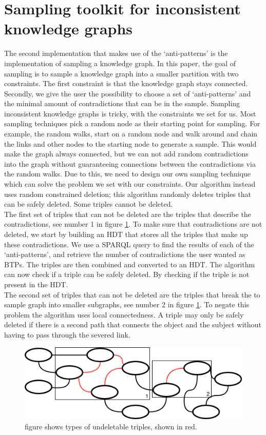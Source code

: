 \documentclass[11pt,letterpaper ,oneside ]{book}
\begin{document}
	\section{Sampling toolkit for inconsistent knowledge graphs}
	The second implementation that makes use of the `anti-patterns' is the implementation of sampling a knowledge graph. In this paper, the goal of sampling is to sample a knowledge graph into a smaller partition with two constraints. The first constraint is that the knowledge graph stays connected. Secondly, we give the user the possibility to choose a set of `anti-patterns' and the minimal amount of contradictions that can be in the sample.
	Sampling inconsistent knowledge graphs is tricky, with the constraints we set for us. Most sampling techniques pick a random node as their starting point for sampling. For example, the random walks, start on a random node and walk around and chain the links and other nodes to the starting node to generate a sample. This would make the graph always connected, but we can not add random contradictions into the graph without guaranteeing connections between the contradictions via the random walks. Due to this, we need to design our own sampling technique which can solve the problem we set with our constraints.
	Our algorithm instead uses random constrained deletion; this algorithm randomly deletes triples that can be safely deleted. Some triples cannot be deleted.\\
	The first set of triples that can not be deleted are the triples that describe the contradictions, see number 1 in figure \ref{fig:sampling}. To make sure that contradictions are not deleted, we start by building an HDT\cite{FMPGPA:13}\cite{MPAF:12} that stores all the triples that make up these contradictions. We use a SPARQL query to find the results of each of the `anti-patterns', and retrieve the number of contradictions the user wanted as BTPs. The triples are then combined and converted to an HDT. The algorithm can now check if a triple can be safely deleted. By checking if the triple is not present in the HDT.\\
	The second set of triples that can not be deleted are the triples that break the to sample graph into smaller subgraphs, see number 2 in figure \ref{fig:sampling}. To negate this problem the algorithm uses local connectedness. A triple may only be safely deleted if there is a second path that connects the object and the subject without having to pass through the severed link.
	\begin{figure}
		\centering
		\includegraphics[width=\linewidth]{images/Sampling.png}
		\caption{figure shows types of undeletable triples, shown in red.}
		\label{fig:sampling}
	\end{figure}
\end{document}
